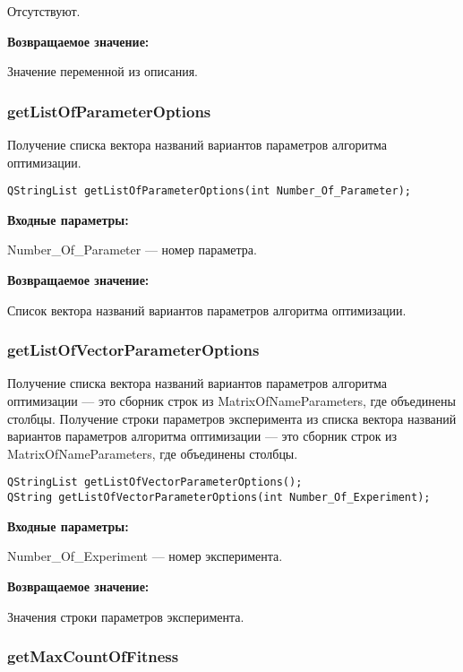\documentclass[a4paper,12pt]{article}
\begin{document}
Отсутствуют.

\textbf{Возвращаемое значение:}

Значение переменной из описания.


\subsubsection{getListOfParameterOptions}\label{getListOfParameterOptions}

Получение списка вектора названий вариантов параметров алгоритма оптимизации.


\begin{lstlisting}[label=code_syntax_getListOfParameterOptions,caption=Синтаксис]
QStringList getListOfParameterOptions(int Number_Of_Parameter);
\end{lstlisting}

\textbf{Входные параметры:}

Number\_Of\_Parameter --- номер параметра.

\textbf{Возвращаемое значение:}

Список вектора названий вариантов параметров алгоритма оптимизации.


\subsubsection{getListOfVectorParameterOptions}\label{getListOfVectorParameterOptions}

Получение списка вектора названий вариантов параметров алгоритма оптимизации --- это сборник строк из MatrixOfNameParameters, где объединены столбцы. Получение строки параметров эксперимента из списка вектора названий вариантов параметров алгоритма оптимизации --- это сборник строк из MatrixOfNameParameters, где объединены столбцы.


\begin{lstlisting}[label=code_syntax_getListOfVectorParameterOptions,caption=Синтаксис]
QStringList getListOfVectorParameterOptions();
QString getListOfVectorParameterOptions(int Number_Of_Experiment);
\end{lstlisting}

\textbf{Входные параметры:}

Number\_Of\_Experiment --- номер эксперимента.

\textbf{Возвращаемое значение:}

Значения строки параметров эксперимента.


\subsubsection{getMaxCountOfFitness}\label{getMaxCountOfFitness}
\end{document}
